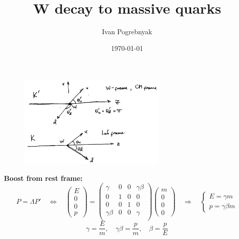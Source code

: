 \documentclass[12pt]{article}
\title{W decay to massive quarks}
\author{Ivan Pogrebnyak}
\date{\today}
\begin{document}
\maketitle

\begin{figure}[H]
  \centering
  \includegraphics[width=0.65\textwidth]{fig/fig.png}
\end{figure}

{\bf Boost from rest frame:}
\begin{equation}
  P = \Lambda P' \quad \Leftrightarrow \quad
%
  \begin{pmatrix} E\\0\\0\\p \end{pmatrix} =
  \begin{pmatrix}
    \gamma & 0 & 0 & \gamma\beta \\
    0 & 1 & 0 & 0 \\
    0 & 0 & 1 & 0 \\
    \gamma\beta & 0 & 0 & \gamma \\
  \end{pmatrix}
  \begin{pmatrix} m\\0\\0\\0 \end{pmatrix}
  \quad \Rightarrow \quad
%
  \left\{\begin{array}{l}
    E = \gamma m \\
    p = \gamma\beta m
  \end{array}\right.
\end{equation}
%
\begin{equation}
  \gamma = \frac{E}{m}, \quad
  \gamma\beta = \frac{p}{m}, \quad
  \beta = \frac{p}{E}
\end{equation}

\end{document}

